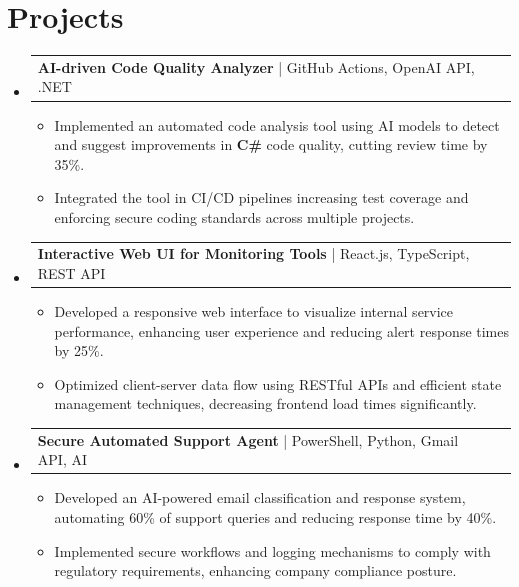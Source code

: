 \documentclass[letterpaper,11pt]{article}
\makeatletter
\newcommand{\resumeItem}[1]{
  \item\footnotesize{
    {#1 \vspace{-2pt}}
  }
}
\newcommand{\resumeProjectHeading}[2]{
    \item
    \begin{tabular*}{1.001\textwidth}{l@{\extracolsep{\fill}}r}
      \small#1 & \textbf{\small #2}\\
    \end{tabular*}\vspace{-7pt}
}
\newcommand{\resumeSubHeadingListStart}{\begin{itemize}[leftmargin=0pt, label={}]}
\newcommand{\resumeSubHeadingListEnd}{\end{itemize}}
\newcommand{\resumeItemListStart}{\begin{itemize}[leftmargin=*]}
\newcommand{\resumeItemListEnd}{\end{itemize}\vspace{-5pt}}
\makeatother
\begin{document}
\section{Projects}
    \vspace{-5pt}
    \resumeSubHeadingListStart
      \resumeProjectHeading
          {\textbf{AI-driven Code Quality Analyzer} | GitHub Actions, OpenAI API, .NET}{}
          \resumeItemListStart
              \resumeItem{Implemented an automated code analysis tool using AI models to detect and suggest improvements in \textbf{C\#} code quality, cutting review time by 35\%.}
              \resumeItem{Integrated the tool in CI/CD pipelines increasing test coverage and enforcing secure coding standards across multiple projects.}
          \resumeItemListEnd
          \vspace{-12pt}
      \resumeProjectHeading
          {\textbf{Interactive Web UI for Monitoring Tools} | React.js, TypeScript, REST API}{}
          \resumeItemListStart
              \resumeItem{Developed a responsive web interface to visualize internal service performance, enhancing user experience and reducing alert response times by 25\%.}
              \resumeItem{Optimized client-server data flow using RESTful APIs and efficient state management techniques, decreasing frontend load times significantly.}
          \resumeItemListEnd
          \vspace{-12pt}
      \resumeProjectHeading
          {\textbf{Secure Automated Support Agent} | PowerShell, Python, Gmail API, AI}{}
          \resumeItemListStart
              \resumeItem{Developed an AI-powered email classification and response system, automating 60\% of support queries and reducing response time by 40\%.}
              \resumeItem{Implemented secure workflows and logging mechanisms to comply with regulatory requirements, enhancing company compliance posture.}
          \resumeItemListEnd
    \resumeSubHeadingListEnd
\end{document}
